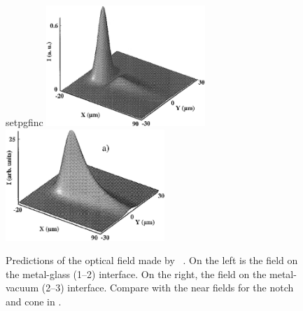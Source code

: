 \begin{figure}[ht]
  \centering
  {setpgfinc}
  \includegraphics[keepaspectratio,width=6cm]{interference/figures/BaidaReflected.png}
  \hspace{1cm}
  \includegraphics[keepaspectratio,width=6cm]{interference/figures/BaidaTransmitted.png}
  \caption{Predictions of the optical field made by
    ~\cite{baida1999theoretical}.  On the left is the field on
    the metal-glass (1--2) interface.  On the right, the field on the
    metal-vacuum (2--3) interface.  Compare with the near fields for the
    notch and cone in .}
  \label{fig:baidacompare}
\end{figure}

